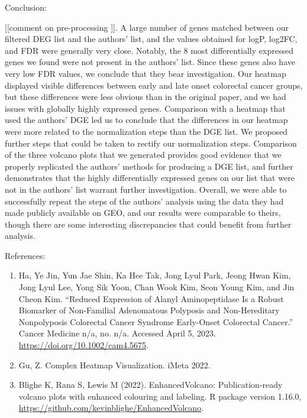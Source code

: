 \documentclass[
]{article}
\begin{document}
Conclusion:

{[}{[}comment on pre-processing {]}{]}. A large number of genes matched
between our filtered DEG list and the authors' list, and the values
obtained for logP, log2FC, and FDR were generally very close. Notably,
the 8 most differentially expressed genes we found were not present in
the authors' list. Since these genes also have very low FDR values, we
conclude that they bear investigation. Our heatmap displayed visible
differences between early and late onset colorectal cancer groups, but
these differences were less obvious than in the original paper, and we
had issues with globally highly expressed genes. Comparison with a
heatmap that used the authors' DGE led us to conclude that the
differences in our heatmap were more related to the normalization steps
than the DGE list. We proposed further steps that could be taken to
rectify our normalization steps. Comparison of the three volcano plots
that we generated provides good evidence that we properly replicated the
authors' methods for producing a DGE list, and further demonstrates that
the highly differentially expressed genes on our list that were not in
the authors' list warrant further investigation. Overall, we were able
to successfully repeat the steps of the authors' analysis using the data
they had made publicly available on GEO, and our results were comparable
to theirs, though there are some interesting discrepancies that could
benefit from further analysis.

References:

\begin{enumerate}
\def\labelenumi{\arabic{enumi}.}
\item
  Ha, Ye Jin, Yun Jae Shin, Ka Hee Tak, Jong Lyul Park, Jeong Hwan Kim,
  Jong Lyul Lee, Yong Sik Yoon, Chan Wook Kim, Seon Young Kim, and Jin
  Cheon Kim. ``Reduced Expression of Alanyl Aminopeptidase Is a Robust
  Biomarker of Non-Familial Adenomatous Polyposis and Non-Hereditary
  Nonpolyposis Colorectal Cancer Syndrome Early-Onset Colorectal
  Cancer.'' Cancer Medicine n/a, no. n/a. Accessed April 5, 2023.
  \url{https://doi.org/10.1002/cam4.5675}.
\item
  Gu, Z. Complex Heatmap Visualization. iMeta 2022.
\item
  Blighe K, Rana S, Lewis M (2022). EnhancedVolcano: Publication-ready
  volcano plots with enhanced colouring and labeling. R package version
  1.16.0, \url{https://github.com/kevinblighe/EnhancedVolcano}.
\end{enumerate}
\end{document}
